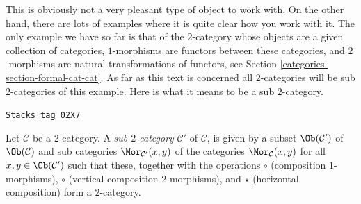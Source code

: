 This is obviously not a very pleasant type of object to work with.
On the other hand, there are lots of examples where it is quite clear
how you work with it. The only example we have so far is that of
the $2$-category whose objects are a given collection of categories,
$1$-morphisms are functors between these categories,
and $2$-morphisms are natural transformations of functors, see
Section \ref{categories-section-formal-cat-cat}.
As far as this text is concerned all $2$-categories will be
sub $2$-categories of this example. Here is what it means to be
a sub $2$-category.

\begin{definition}
\label{categories-definition-sub-2-category}
\href{https://stacks.math.columbia.edu/tag/02X7}{\texttt{Stacks tag 02X7}}

Let $\mathcal{C}$ be a $2$-category.
A {\it sub $2$-category} $\mathcal{C}'$ of $\mathcal{C}$, is given by a subset
$\Ob(\mathcal{C}')$ of $\Ob(\mathcal{C})$
and sub categories $\Mor_{\mathcal{C}'}(x, y)$ of the
categories $\Mor_\mathcal{C}(x, y)$ for all
$x, y \in \Ob(\mathcal{C}')$ such that these, together with
the operations $\circ$ (composition $1$-morphisms), $\circ$ (vertical
composition $2$-morphisms), and $\star$ (horizontal composition)
form a $2$-category.
\end{definition}

